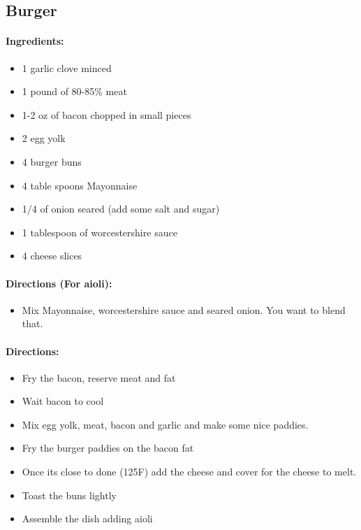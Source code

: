 \documentclass{article}
\begin{document}
\subsection{Burger}

\paragraph{Ingredients:}

\begin{itemize}
	\item 1 garlic clove minced
	\item 1 pound of 80-85\% meat
	\item 1-2 oz of bacon chopped in small pieces
	\item 2 egg yolk
	\item 4 burger buns
	\item 4 table spoons Mayonnaise
	\item 1/4 of onion seared (add some salt and sugar)
	\item 1 tablespoon of worcestershire sauce
	\item 4 cheese slices
\end{itemize}

\paragraph{Directions (For aioli):}
\begin{itemize}
	\item Mix Mayonnaise, worcestershire sauce and seared onion. You want to blend that.
\end{itemize}

\paragraph{Directions:}
\begin{itemize}
	\item Fry the bacon, reserve meat and fat
	\item Wait bacon to cool
	\item Mix egg yolk, meat, bacon and garlic and make some nice paddies.
	\item Fry the burger paddies on the bacon fat
	\item Once its close to done (125F) add the cheese and cover for the cheese to melt.
	\item Toast the buns lightly
	\item Assemble the dish adding aioli
\end{itemize}
\end{document}
